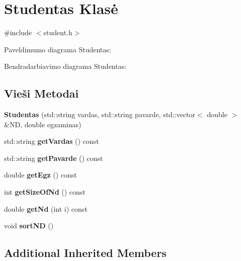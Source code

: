 \hypertarget{classStudentas}{}\section{Studentas Klasė}
\label{classStudentas}


{\ttfamily \#include $<$student.\+h$>$}



Paveldimumo diagrama Studentas\+:


Bendradarbiavimo diagrama Studentas\+:
\subsection*{Vieši Metodai}
\begin{DoxyCompactItemize}
\item 
\mbox{\label{classStudentas_ac94312f97fe4d9078022514a256234c2}} 
{\bfseries Studentas} (std\+::string vardas, std\+::string pavarde, std\+::vector$<$ double $>$ \&ND, double egzaminas)
\item 
\mbox{\label{classStudentas_a4471c08cbf44faf5fe5f4c192922bf1b}} 
std\+::string {\bfseries get\+Vardas} () const
\item 
\mbox{\label{classStudentas_afc1c025f58544eed43273afa98445853}} 
std\+::string {\bfseries get\+Pavarde} () const
\item 
\mbox{\label{classStudentas_adb6ecd72f1921da4c4ae7b8bc6ce81bc}} 
double {\bfseries get\+Egz} () const
\item 
\mbox{\label{classStudentas_af18aca7e55473f83fd32058c65f50677}} 
int {\bfseries get\+Size\+Of\+Nd} () const
\item 
\mbox{\label{classStudentas_aa09b42305d6cce1376246790d7ae76ee}} 
double {\bfseries get\+Nd} (int i) const
\item 
\mbox{\label{classStudentas_aa83dcefe1a34535114b31da10a540b6b}} 
void {\bfseries sort\+ND} ()
\end{DoxyCompactItemize}
\subsection*{Additional Inherited Members}


